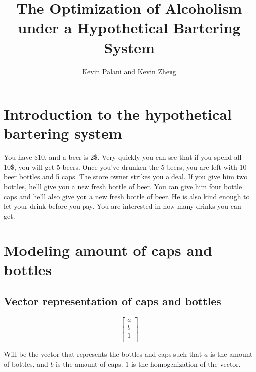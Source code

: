 \documentclass[letterpaper, 12pt]{article}
\title{The Optimization of Alcoholism under a Hypothetical Bartering System}
\author{Kevin Palani and Kevin Zheng}
\begin{document}
\maketitle
\section{Introduction to the hypothetical bartering system}
\par You have \$10, and a beer is 2\$.
Very quickly you can see that if you spend all 10\$, you will get 5 beers.
Once you've drunken the 5 beers, you are left with 10 beer bottles and 5 caps.
The store owner strikes you a deal.
If you give him two bottles, he'll give you a new fresh bottle of beer.
You can give him four bottle caps and he'll also give you a new fresh bottle of beer.
He is also kind enough to let your drink before you pay.
You are interested in how many drinks you can get.
\section{Modeling amount of caps and bottles}
\subsection{Vector representation of caps and bottles}
\[
	\begin{bmatrix}
		a\\
		b\\
		1\\
	\end{bmatrix}
\]
\par Will be the vector that represents the bottles and caps such that $a$ is the amount of bottles, and $b$ is the amount of caps.
$1$ is the homogenization of the vector.
\end{document}
